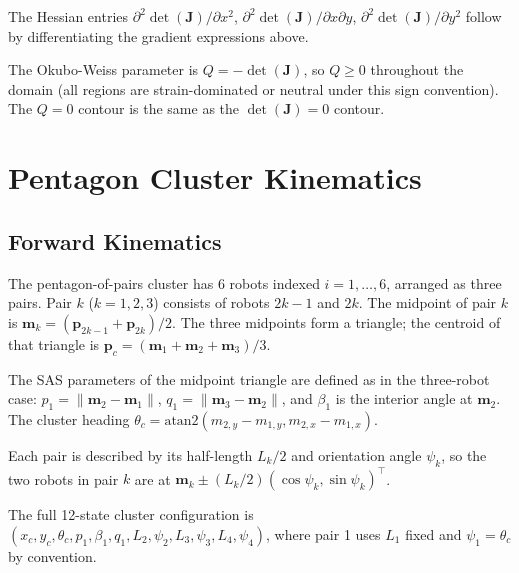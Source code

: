 \documentclass[lettersize,journal]{IEEEtran}
\begin{document}
The Hessian entries $\partial^2 \det(\mathbf{J}) / \partial x^2$,
$\partial^2 \det(\mathbf{J}) / \partial x \partial y$,
$\partial^2 \det(\mathbf{J}) / \partial y^2$ follow by differentiating the
gradient expressions above.


The Okubo-Weiss parameter is $Q = -\det(\mathbf{J})$, so $Q \geq 0$
throughout the domain (all regions are strain-dominated or neutral under
this sign convention). The $Q = 0$ contour is the same as the
$\det(\mathbf{J}) = 0$ contour.



\section{Pentagon Cluster Kinematics}
\label{app:kinematics}

\subsection{Forward Kinematics}

The pentagon-of-pairs cluster has 6 robots indexed $i = 1, \ldots, 6$, arranged
as three pairs. Pair $k$ ($k = 1, 2, 3$) consists of robots $2k-1$ and $2k$.
The midpoint of pair $k$ is $\mathbf{m}_k = (\mathbf{p}_{2k-1} +
\mathbf{p}_{2k})/2$. The three midpoints form a triangle; the centroid of that
triangle is $\mathbf{p}_c = (\mathbf{m}_1 + \mathbf{m}_2 + \mathbf{m}_3)/3$.

The SAS parameters of the midpoint triangle are defined as in the three-robot
case: $p_1 = \|\mathbf{m}_2 - \mathbf{m}_1\|$, $q_1 = \|\mathbf{m}_3 -
\mathbf{m}_2\|$, and $\beta_1$ is the interior angle at $\mathbf{m}_2$.
The cluster heading $\theta_c = \text{atan2}(m_{2,y} - m_{1,y},
m_{2,x} - m_{1,x})$.

Each pair is described by its half-length $L_k/2$ and orientation angle
$\psi_k$, so the two robots in pair $k$ are at $\mathbf{m}_k \pm (L_k/2)
(\cos\psi_k, \sin\psi_k)^\top$.

The full 12-state cluster configuration is
$(x_c, y_c, \theta_c, p_1, \beta_1, q_1, L_2, \psi_2, L_3, \psi_3,
L_4, \psi_4)$, where pair 1 uses $L_1$ fixed and $\psi_1 = \theta_c$ by
convention.
\end{document}
